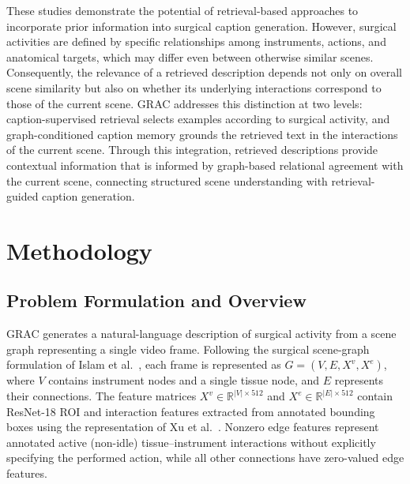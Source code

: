 \documentclass[11pt]{article}
\begin{document}
These studies demonstrate the potential of retrieval-based approaches to incorporate prior information into surgical caption generation. However, surgical activities are defined by specific relationships among instruments, actions, and anatomical targets, which may differ even between otherwise similar scenes. Consequently, the relevance of a retrieved description depends not only on overall scene similarity but also on whether its underlying interactions correspond to those of the current scene. GRAC addresses this distinction at two levels: caption-supervised retrieval selects examples according to surgical activity, and graph-conditioned caption memory grounds the retrieved text in the interactions of the current scene. Through this integration, retrieved descriptions provide contextual information that is informed by graph-based relational agreement with the current scene, connecting structured scene understanding with retrieval-guided caption generation.

\section{Methodology}\label{sec3}

\subsection{Problem Formulation and Overview}\label{subsec3.1}

GRAC generates a natural-language description of surgical activity from a scene graph representing a single video frame. Following the surgical scene-graph formulation of Islam et al.~\cite{b2}, each frame is represented as $G = (V,E,X^{v},X^{e})$, where $V$ contains instrument nodes and a single tissue node, and $E$ represents their connections. The feature matrices $X^{v} \in \mathbb{R}^{|V| \times 512}$ and $X^{e} \in \mathbb{R}^{|E| \times 512}$ contain ResNet-18 ROI and interaction features extracted from annotated bounding boxes using the representation of Xu et al.~\cite{b3}. Nonzero edge features represent annotated active (non-idle) tissue--instrument interactions without explicitly specifying the performed action, while all other connections have zero-valued edge features. 
\end{document}
